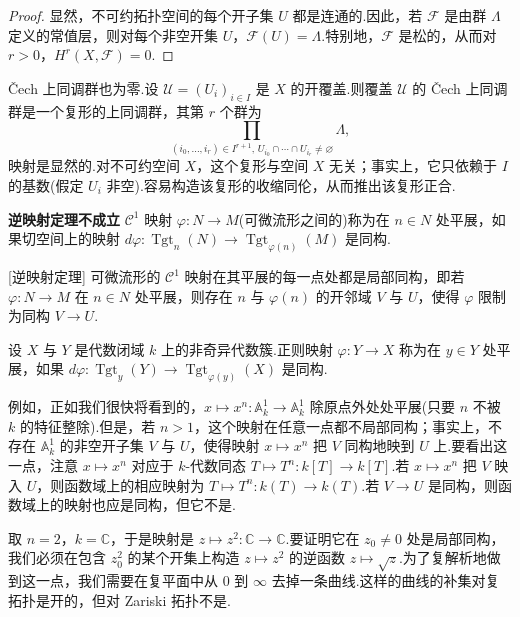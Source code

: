 \begin{proof}
显然，不可约拓扑空间的每个开子集 $U$ 都是连通的.因此，若 $\mathcal{F}$ 是由群 $\Lambda$ 定义的常值层，则对每个非空开集 $U$，$\mathcal{F}(U) = \Lambda$.特别地，$\mathcal{F}$ 是松的，从而对 $r > 0$，$H^{r}(X, \mathcal{F}) = 0$.
\end{proof}

\begin{remark}\label{rem:1.2}
\v{C}ech 上同调群也为零.设 $\mathcal{U} = (U_i)_{i \in I}$ 是 $X$ 的开覆盖.则覆盖 $\mathcal{U}$ 的 \v{C}ech 上同调群是一个复形的上同调群，其第 $r$ 个群为
\[
\prod_{(i_0, \ldots, i_r) \in I^{r+1},\, U_{i_0} \cap \cdots \cap U_{i_r} \neq \varnothing} \Lambda,
\]
映射是显然的.对不可约空间 $X$，这个复形与空间 $X$ 无关；事实上，它只依赖于 $I$ 的基数(假定 $U_i$ 非空).容易构造该复形的收缩同伦，从而推出该复形正合.
\end{remark}

\textbf{逆映射定理不成立} $\mathcal{C}^{1}$ 映射 $\varphi \colon N \to M$(可微流形之间的)称为在 $n \in N$ 处平展，如果切空间上的映射 $d\varphi \colon \operatorname{Tgt}_{n}(N) \to \operatorname{Tgt}_{\varphi(n)}(M)$ 是同构.

\begin{theorem}\label{thm:1.3}[逆映射定理]
可微流形的 $\mathcal{C}^{1}$ 映射在其平展的每一点处都是局部同构，即若 $\varphi \colon N \to M$ 在 $n \in N$ 处平展，则存在 $n$ 与 $\varphi(n)$ 的开邻域 $V$ 与 $U$，使得 $\varphi$ 限制为同构 $V \to U$.
\end{theorem}

设 $X$ 与 $Y$ 是代数闭域 $k$ 上的非奇异代数簇.正则映射 $\varphi \colon Y \to X$ 称为在 $y \in Y$ 处平展，如果 $d\varphi \colon \operatorname{Tgt}_{y}(Y) \to \operatorname{Tgt}_{\varphi(y)}(X)$ 是同构.

例如，正如我们很快将看到的，$x \mapsto x^{n} \colon \mathbb{A}^{1}_{k} \to \mathbb{A}^{1}_{k}$ 除原点外处处平展(只要 $n$ 不被 $k$ 的特征整除).但是，若 $n > 1$，这个映射在任意一点都不局部同构；事实上，不存在 $\mathbb{A}^{1}_{k}$ 的非空开子集 $V$ 与 $U$，使得映射 $x \mapsto x^{n}$ 把 $V$ 同构地映到 $U$ 上.要看出这一点，注意 $x \mapsto x^{n}$ 对应于 $k$-代数同态 $T \mapsto T^{n} \colon k[T] \to k[T]$.若 $x \mapsto x^{n}$ 把 $V$ 映入 $U$，则函数域上的相应映射为 $T \mapsto T^{n} \colon k(T) \to k(T)$.若 $V \to U$ 是同构，则函数域上的映射也应是同构，但它不是.

取 $n = 2$，$k = \mathbb{C}$，于是映射是 $z \mapsto z^{2} \colon \mathbb{C} \to \mathbb{C}$.要证明它在 $z_0 \neq 0$ 处是局部同构，我们必须在包含 $z_0^{2}$ 的某个开集上构造 $z \mapsto z^{2}$ 的逆函数 $z \mapsto \sqrt{z}$.为了复解析地做到这一点，我们需要在复平面中从 0 到 $\infty$ 去掉一条曲线.这样的曲线的补集对复拓扑是开的，但对 Zariski 拓扑不是.

